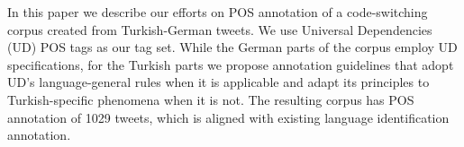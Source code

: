 In this paper we describe our efforts on POS annotation of a code-switching corpus created from Turkish-German tweets. We use Universal Dependencies (UD) POS tags as our tag set. While the German parts of the corpus employ UD specifications, for the Turkish parts we propose annotation guidelines that adopt UD's language-general rules when it is applicable and adapt its principles to Turkish-specific phenomena when it is not. The resulting corpus has POS annotation of 1029 tweets, which is aligned with existing language identification annotation.
